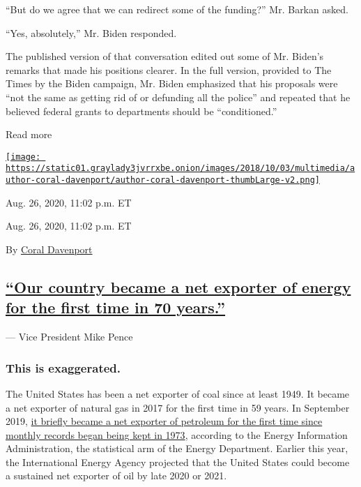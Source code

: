 ``But do we agree that we can redirect some of the funding?'' Mr. Barkan
asked.

``Yes, absolutely,'' Mr. Biden responded.

The published version of that conversation edited out some of Mr.
Biden's remarks that made his positions clearer. In the full version,
provided to The Times by the Biden campaign, Mr. Biden emphasized that
his proposals were ``not the same as getting rid of or defunding all the
police'' and repeated that he believed federal grants to departments
should be ``conditioned.''

Read more

\href{https://www.nytimes3xbfgragh.onion/by/coral-davenport}{\texttt{[image: https://static01.graylady3jvrrxbe.onion/images/2018/10/03/multimedia/author-coral-davenport/author-coral-davenport-thumbLarge-v2.png]}}

Aug. 26, 2020, 11:02 p.m. ET

Aug. 26, 2020, 11:02 p.m. ET

By \href{https://www.nytimes3xbfgragh.onion/by/coral-davenport}{Coral
Davenport}

\hypertarget{our-country-became-a-net-exporter-of-energy-for-the-first-time-in-70-years}{%
\subsection{\texorpdfstring{\protect\hyperlink{our-country-became-a-net-exporter-of-energy-for-the-first-time-in-70-years}{``Our
country became a net exporter of energy for the first time in 70
years.''}}{``Our country became a net exporter of energy for the first time in 70 years.''}}\label{our-country-became-a-net-exporter-of-energy-for-the-first-time-in-70-years}}

--- Vice President Mike Pence

\hypertarget{this-is-exaggerated}{%
\subsubsection{This is exaggerated.}\label{this-is-exaggerated}}

The United States has been a net exporter of coal since at least 1949.
It became a net exporter of natural gas in 2017 for the first time in 59
years. In September 2019,
\href{https://slack-redir.net/link?url=https\%3A\%2F\%2Fwww.eia.gov\%2Ftodayinenergy\%2Fdetail.php\%3Fid\%3D42176}{it
briefly became a net exporter of petroleum for the first time since
monthly records began being kept in 1973}, according to the Energy
Information Administration, the statistical arm of the Energy
Department. Earlier this year, the International Energy Agency projected
that the United States could become a sustained net exporter of oil by
late 2020 or 2021.

